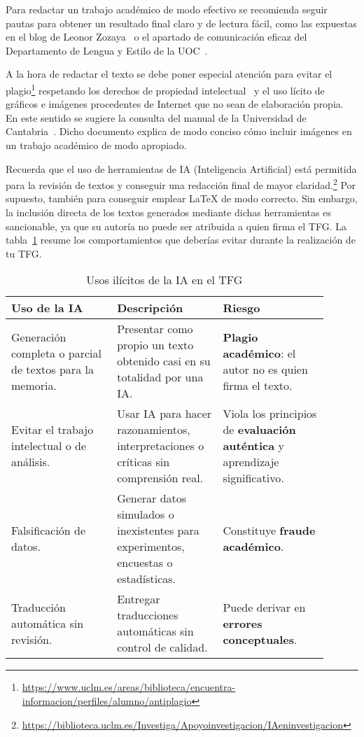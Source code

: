 Para redactar un trabajo académico de modo efectivo se recomienda seguir pautas para obtener un resultado final claro y de lectura fácil, como las expuestas en el blog de Leonor Zozaya~\cite{zozaya17} o el apartado de comunicación eficaz del Departamento de Lengua y Estilo de la UOC~\cite{uoc}.

A la hora de redactar el texto se debe poner especial atención para evitar el plagio\footnote{\url{https://www.uclm.es/areas/biblioteca/encuentra-informacion/perfiles/alumno/antiplagio}} respetando los derechos de propiedad intelectual~\cite{uc3m21} y el uso lícito de gráficos e imágenes procedentes de Internet que no sean de elaboración propia. En este sentido se sugiere la consulta del manual de la Universidad de Cantabria~\cite{unican18}. Dicho documento explica de modo conciso cómo incluir imágenes en un trabajo académico de modo apropiado.

Recuerda que el uso de herramientas de IA (Inteligencia Artificial) está permitida para la revisión de textos y conseguir una redacción final de mayor claridad.\footnote{\url{https://biblioteca.uclm.es/Investiga/Apoyoinvestigacion/IAeninvestigacion}} Por supuesto, también para conseguir emplear \LaTeX{} de modo correcto. Sin embargo, la inclusión directa de los textos generados mediante dichas herramientas es sancionable, ya que su autoría no puede ser atribuida a quien firma el TFG. La tabla~\ref{tab:ia} resume los comportamientos que deberías evitar durante la realización de tu TFG.

\begin{table}[H]%
	\centering
	\caption{Usos ilícitos de la IA en el TFG}
	\label{tab:ia}
	\begin{tabular}{ | p{0.3\linewidth} | p{0.3\linewidth} | p{0.3\linewidth} |}
		\hline
		\textbf{Uso de la IA} & \textbf{Descripción} & \textbf{Riesgo} \\
		\hline
		Generación completa o parcial de textos para la memoria.&
		Presentar como propio un texto obtenido casi en su totalidad por una IA. &
		\textbf{Plagio académico}: el autor no es quien firma el texto.\\
		\hline
		Evitar el trabajo intelectual o de análisis. &
		Usar IA para hacer razonamientos, interpretaciones o críticas sin comprensión real. &
		Viola los principios de \textbf{evaluación auténtica} y aprendizaje significativo. \\
		\hline
		Falsificación de datos. & Generar datos simulados o inexistentes para experimentos, encuestas o estadísticas. &
		Constituye \textbf{fraude académico}.\\
		\hline
		Traducción automática sin revisión. &
		Entregar traducciones automáticas sin control de calidad. &
		Puede derivar en \textbf{errores conceptuales}.\\
		\hline
	\end{tabular}
\end{table}


